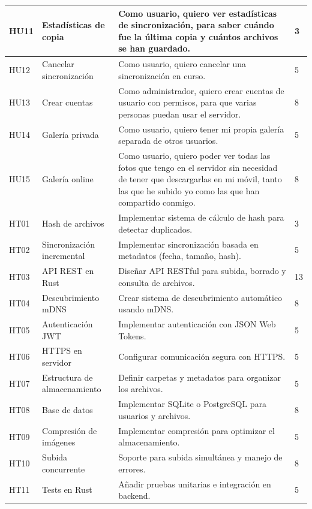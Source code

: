 \begin{tabularx}{\textwidth}{|l|l|>{\raggedright\arraybackslash}X|l|}
    \hline
    HU11 & Estadísticas de copia & Como usuario, quiero ver estadísticas de sincronización, para saber cuándo fue la última copia y cuántos archivos se han guardado. & 3 \\
    \hline
    HU12 & Cancelar sincronización & Como usuario, quiero cancelar una sincronización en curso. & 5 \\
    \hline
    HU13 & Crear cuentas & Como administrador, quiero crear cuentas de usuario con permisos, para que varias personas puedan usar el servidor. & 8 \\
    \hline
    HU14 & Galería privada & Como usuario, quiero tener mi propia galería separada de otros usuarios. & 5 \\
    \hline
    HU15 & Galería online & Como usuario, quiero poder ver todas las fotos que tengo en el servidor sin necesidad de tener que descargarlas en mi móvil, tanto las que he subido yo como las que han compartido conmigo. & 8 \\
    \hline
    HT01 & Hash de archivos & Implementar sistema de cálculo de hash para detectar duplicados. & 3 \\
    \hline
    HT02 & Sincronización incremental & Implementar sincronización basada en metadatos (fecha, tamaño, hash). & 5 \\
    \hline
    HT03 & API REST en Rust & Diseñar API RESTful para subida, borrado y consulta de archivos. & 13 \\
    \hline
    HT04 & Descubrimiento mDNS & Crear sistema de descubrimiento automático usando mDNS. & 8 \\
    \hline
    HT05 & Autenticación JWT & Implementar autenticación con JSON Web Tokens. & 5 \\
    \hline
    HT06 & HTTPS en servidor & Configurar comunicación segura con HTTPS. & 5 \\
    \hline
    HT07 & Estructura de almacenamiento & Definir carpetas y metadatos para organizar los archivos. & 5 \\
    \hline
    HT08 & Base de datos & Implementar SQLite o PostgreSQL para usuarios y archivos. & 8 \\
    \hline
    HT09 & Compresión de imágenes & Implementar compresión para optimizar el almacenamiento. & 5 \\
    \hline
    HT10 & Subida concurrente & Soporte para subida simultánea y manejo de errores. & 8 \\
    \hline
    HT11 & Tests en Rust & Añadir pruebas unitarias e integración en backend. & 5 \\

\end{tabularx}
